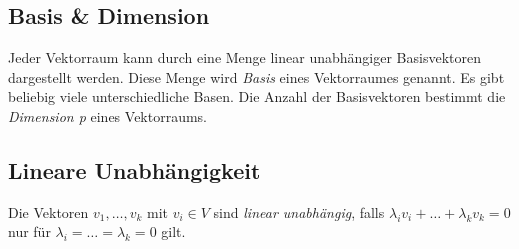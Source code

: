 \subsection{Basis \& Dimension}
Jeder Vektorraum kann durch eine Menge linear unabh\"angiger Basisvektoren dargestellt werden. Diese Menge wird \textit{Basis} eines Vektorraumes genannt. Es gibt beliebig viele unterschiedliche Basen. Die Anzahl der Basisvektoren bestimmt die \textit{Dimension p} eines Vektorraums.



\subsection{Lineare Unabh\"angigkeit}
Die Vektoren $v_1,\dots,v_k$ mit $v_i \in V$ sind \textit{linear unabh\"angig}, falls $\lambda_iv_i+\dots+\lambda_kv_k = 0$ nur f\"ur $\lambda_i=\dots=\lambda_k= 0$ gilt. 

%
